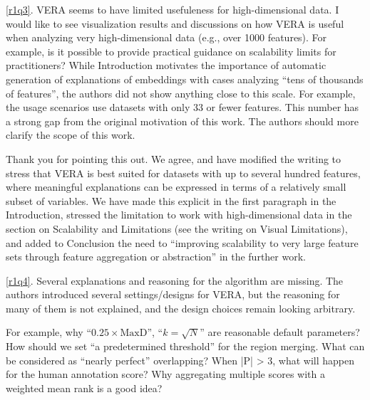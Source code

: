 \documentclass[11pt]{article}
\newcounter{rtaskno}
\newcommand{\rtask}[1]{\refstepcounter{rtaskno}\label{#1}}
\newcommand{\reviewc}[2]{\begin{leftbar}\noindent\rtask{#1}\ref{#1}. #2\end{leftbar}\vspace*{-4mm}}
\newcommand{\answer}[1]{\noindent #1\par\vspace{2mm}}
\newlength{\leftbarwidth}
\newlength{\leftbarsep}
\renewenvironment{leftbar}{%
    \def\FrameCommand{{\color{black}{\vrule width \leftbarwidth\relax\hspace {\leftbarsep}}}}%
    \MakeFramed {\advance \hsize -\width \FrameRestore }%
}{\endMakeFramed}
\begin{document}
\reviewc{r1q3}{VERA seems to have limited usefuleness for high-dimensional data.
I would like to see visualization results and discussions on how VERA is useful when analyzing very high-dimensional data (e.g., over 1000 features). For example, is it possible to provide practical guidance on scalability limits for practitioners? While Introduction motivates the importance of automatic generation of explanations of embeddings with cases analyzing “tens of thousands of features”, the authors did not show anything close to this scale. For example, the usage scenarios use datasets with only 33 or fewer features. This number has a strong gap from the original motivation of this work. The authors should more clarify the scope of this work.}

\answer{%
Thank you for pointing this out. We agree, and have modified the writing to stress that VERA is best suited for datasets with up to several hundred features, where meaningful explanations can be expressed in terms of a relatively small subset of variables. We have made this explicit in the first paragraph in the Introduction, stressed the limitation to work with high-dimensional data in the section on Scalability and Limitations (see the writing on Visual Limitations), and added to Conclusion the need to ``improving scalability to very large feature sets through feature aggregation or abstraction'' in the further work.
}


\reviewc{r1q4}{Several explanations and reasoning for the algorithm are missing.
The authors introduced several settings/designs for VERA, but the reasoning for many of them is not explained, and the design choices remain looking arbitrary.

For example, why ``$0.25 \times \text{MaxD}$'', ``$k=\sqrt N$'' are reasonable default parameters? How should we set “a predetermined threshold” for the region merging. What can be considered as “nearly perfect” overlapping? When |P| > 3, what will happen for the human annotation score? Why aggregating multiple scores with a weighted mean rank is a good idea?}
\end{document}
